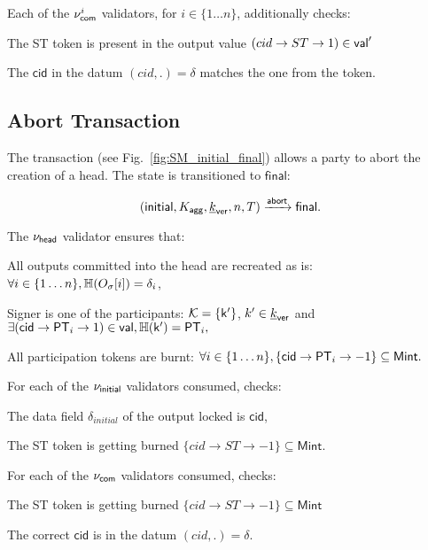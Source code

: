 \noindent Each of the $\nu_\mathsf{com}^i$ validators, for $i \in \{ 1\dots n\}$, additionally checks:
\begin{menumerate}
    \item The ST token is present in the output value $(cid \rightarrow ST \rightarrow 1) \in \mathsf{val}'$
    \item The $\mathsf{cid}$ in the datum $(cid,.) = \delta$ matches the one from the token.
\end{menumerate}

\subsection{Abort Transaction}\label{sec:abort-tx} 




The \mtxAbort{} transaction
(see Fig.~\ref{fig:SM_initial_final}) allows a party to abort the
creation of a head.  The state is transitioned to $\mathsf{final}$:

$$
   (\mathsf{initial},K_{\mathsf{agg}},\underline{k}_{\mathsf{ver}},n,T) \xrightarrow{\mathsf{abort}} \mathsf{final}.
$$

\noindent The $\nu_\mathsf{head}$ validator ensures that:
\begin{menumerate}
 \item All outputs committed into the head are recreated as is: $\forall i \in \{1\dots n\}, \mathbb{H}(O_\sigma[i]) = \delta_i$,
  \item Signer is one of the participants: $\mathcal K = \{\mathsf{k'}\}$, $k' \in \underline{k}_{\mathsf{ver}}$ and
    $
    \exists (\mathsf{cid} \rightarrow \mathsf{PT}_i \rightarrow 1) \in \mathsf{val}, \mathbb{H}(\mathsf{k'}) = \mathsf{PT}_i,
    $
 \item All participation tokens are burnt: $\forall i \in \{1\dots n\}, \{\mathsf{cid} \rightarrow \mathsf{PT}_i \rightarrow -1\} \subseteq \mathsf{Mint}.$
\end{menumerate} 

\noindent For each of the $\nu_\mathsf{initial}$ validators consumed, checks:
\begin{menumerate}
  \item The data field $\delta_{initial}$ of the output locked is $\mathsf{cid}$,
  \item The ST token is getting burned $\{cid \rightarrow ST \rightarrow -1\} \subseteq \mathsf{Mint}.$ 
\end{menumerate}

\noindent For each of the $\nu_\mathsf{com}$ validators consumed, checks:
\begin{menumerate}
  \item The ST token is getting burned $\{cid \rightarrow ST \rightarrow -1\} \subseteq \mathsf{Mint}$
  \item The correct $\mathsf{cid}$ is in the datum $(cid,.) = \delta$.
\end{menumerate}

